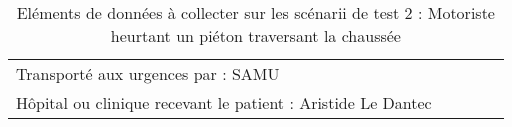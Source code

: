 \documentclass[a4paper,12pt,twoside,french]{book}
[a4paper,12pt,twoside]
\begin{document}
\begin{landscape}
\begin{table}[]
\begin{adjustbox}{width=2.1\textwidth,center=\textwidth}
\begin{tabular}{|l|l|l|l|l|}
Transporté aux urgences par : SAMU                                                                                   &                                                             &                                                                                     &                                                                                    &  \\
Hôpital ou clinique recevant le patient :   Aristide Le Dantec                                                       &                                                             &                                                                                     &                                                                                    & \\

\hline
\end{tabular}

\end{adjustbox}
\caption{Eléments de données à collecter sur les scénarii de test 2 : Motoriste heurtant un piéton traversant la chaussée}
\label{tab:collect_scenario_2}

\end{table}
\end{landscape}
\end{document}
